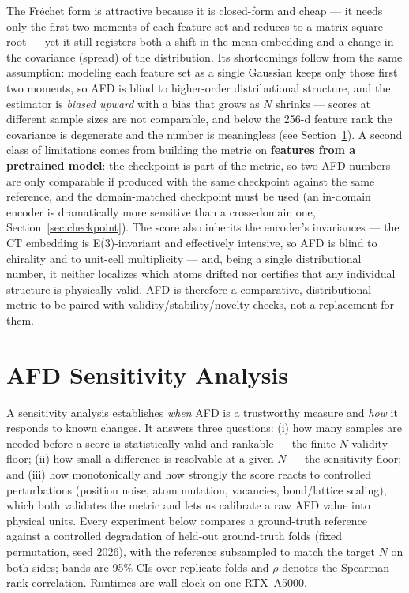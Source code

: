 \documentclass[11pt]{article}
\begin{document}
The Fr\'echet form is attractive because it is closed-form and cheap --- it needs only the
first two moments of each feature set and reduces to a matrix square root --- yet it still
registers both a shift in the mean embedding and a change in the covariance (spread) of the
distribution. Its shortcomings follow from the same assumption: modeling each feature set as
a single Gaussian keeps only those first two moments, so AFD is blind to higher-order
distributional structure, and the estimator is \emph{biased upward} with a bias that grows as
$N$ shrinks --- scores at different sample sizes are not comparable, and below the 256-d
feature rank the covariance is degenerate and the number is meaningless (see
Section~\ref{sec:sensitivity}). A second class of limitations comes from building the metric
on \textbf{features from a pretrained model}: the checkpoint is part of the metric, so two AFD
numbers are only comparable if produced with the same checkpoint against the same reference,
and the domain-matched checkpoint must be used (an in-domain encoder is dramatically more
sensitive than a cross-domain one, Section~\ref{sec:checkpoint}). The score also inherits the
encoder's invariances --- the CT embedding is E(3)-invariant and effectively intensive, so AFD
is blind to chirality and to unit-cell multiplicity --- and, being a single distributional
number, it neither localizes which atoms drifted nor certifies that any individual structure
is physically valid. AFD is therefore a comparative, distributional metric to be paired with
validity/stability/novelty checks, not a replacement for them.

\section{AFD Sensitivity Analysis}
\label{sec:sensitivity}

A sensitivity analysis establishes \emph{when} AFD is a trustworthy measure and \emph{how}
it responds to known changes. It answers three questions: (i) how many samples are needed
before a score is statistically valid and rankable --- the finite-$N$ validity floor; (ii)
how small a difference is resolvable at a given $N$ --- the sensitivity floor; and (iii) how
monotonically and how strongly the score reacts to controlled perturbations (position noise,
atom mutation, vacancies, bond/lattice scaling), which both validates the metric and lets us
calibrate a raw AFD value into physical units. Every experiment below compares a ground-truth
reference against a controlled degradation of held-out ground-truth folds (fixed permutation,
seed 2026), with the reference subsampled to match the target $N$ on both sides; bands are
95\% CIs over replicate folds and $\rho$ denotes the Spearman rank correlation. Runtimes are
wall-clock on one RTX~A5000.
\end{document}
